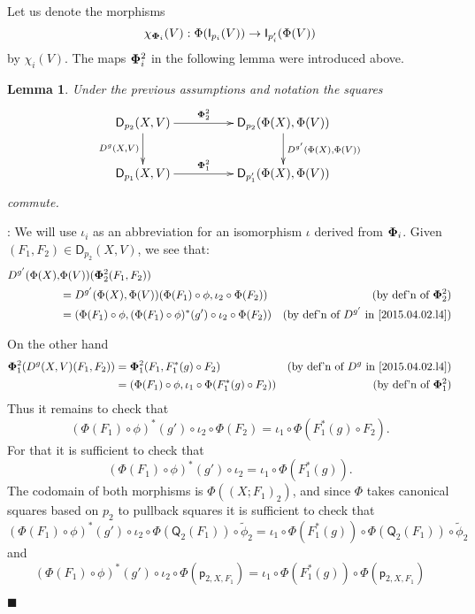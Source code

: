 \documentclass[12pt]{article}
\numberwithin{equation}{section}
\newenvironment{myproof}{{\bf Proof}:}{$\blacksquare$ \vskip 5mm }
\newtheorem{lemma}[proposition]{Lemma}
\newcommand{\by}[1]{\text{(by #1)}}
\newcommand{\sr}{\rightarrow}
\newcommand{\wt}{\widetilde}
\newcommand{\p}{\mathsf{p}}
\newcommand{\D}{\mathsf{D}}
\newcommand{\I}{\mathsf{I}}
\newcommand{\Q}{\mathsf{Q}}
\begin{document}
Let us denote the morphisms
%
$$\chi_{{\bf\Phi}_i}(V):\Phi(\I_{p_i}(V))\sr \I_{p'_i}(\Phi(V))$$
%
by $\chi_i(V)$. The maps ${\bf\Phi}_i^2$ in the following lemma were introduced above.
%
\begin{lemma}
\label{2015.04.08.l1} Under the previous assumptions and notation the squares
%
$$
\begin{xy}
          \xymatrix@C=4pc{ \D_{p_2}(X,V) \ar[r]^-{{\bf\Phi}_2^2}
            \ar[d]_{D^g(X,V)} & \D_{p_2}(\Phi(X),\Phi(V))
            \ar[d]^{D^{g'}(\Phi(X),\Phi(V))}\\ \D_{p_1}(X,V)
            \ar[r]^-{{\bf\Phi}_1^2} & \D_{p_1'}(\Phi(X),\Phi(V)) }
\end{xy}
$$
%
commute.
\end{lemma}
%
\begin{myproof}
We will use $\iota_i$ as an abbreviation for an isomorphism $\iota$ derived from ${\bf\Phi}_i$.
Given $(F_1,F_2)\in \D_{p_2}(X,V)$, we see that:
%
\begin{align*}
  D^{g'}(\Phi(X),&\Phi(V))({\bf\Phi}_2^2(F_1,F_2)) \\
    & = D^{g'}(\Phi(X),\Phi(V))(\Phi(F_1)\circ \phi, \iota_2\circ \Phi(F_2)) & \by{def'n of ${\bf\Phi}_2^2$} \\
    & = (\Phi(F_1)\circ \phi, (\Phi(F_1)\circ \phi)^*(g')\circ \iota_2\circ \Phi(F_2)) & \by{def'n of $D^{g'}$ in \ref{2015.04.02.l4}}
\end{align*}

On the other hand
%
\begin{align*}
  {\bf\Phi}_1^2(D^g(X,V)(F_1,F_2)) 
    & = {\bf\Phi}_1^2(F_1,F_1^*(g)\circ F_2)  & \by{def'n of $D^g$ in \ref{2015.04.02.l4}} \\
    & = (\Phi(F_1)\circ\phi,\iota_1\circ \Phi(F_1^*(g)\circ F_2)) & \by{def'n of ${\bf\Phi}_1^2$} 
\end{align*}
%
Thus it remains to check that
%
$$(\Phi(F_1)\circ \phi)^*(g')\circ \iota_2\circ \Phi(F_2)=\iota_1\circ
\Phi(F_1^*(g)\circ F_2).$$
%
For that it is sufficient to check that
%
$$(\Phi(F_1)\circ \phi)^*(g')\circ \iota_2=\iota_1\circ \Phi(F_1^*(g)).$$
%
The codomain of both morphisms is $\Phi((X;F_1)_2)$, and since $\Phi$ takes
canonical squares based on $p_2$ to pullback squares it is sufficient to check
that
%
$$(\Phi(F_1)\circ \phi)^*(g')\circ \iota_2\circ
\Phi(\Q_2(F_1))\circ\wt{\phi}_2=\iota_1\circ \Phi(F_1^*(g))\circ
\Phi(\Q_2(F_1))\circ\wt{\phi}_2$$
%
and
%
$$(\Phi(F_1)\circ \phi)^*(g')\circ \iota_2\circ \Phi(\p_{2,X,F_1})=\iota_1\circ
\Phi(F_1^*(g))\circ \Phi(\p_{2,X,F_1})$$
%


\end{myproof}
\end{document}
